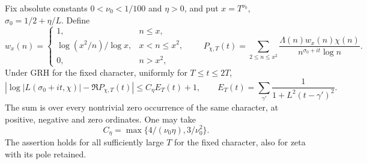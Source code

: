 \begin{lemma}
\label{lem:A049-smoothed-logarithm}
Fix absolute constants \(0<\nu_0<1/100\) and \(\eta>0\), and put
\(x=T^{\nu_0}\), \(\sigma_0=1/2+\eta/L\). Define
\[
 w_x(n)=
 \begin{cases}
 1,&n\le x,\\
 \log(x^2/n)/\log x,&x<n\le x^2,\\
 0,&n>x^2,
 \end{cases}
 \qquad
 P_{\chi,T}(t)=\sum_{2\le n\le x^2}
       \frac{\Lambda(n)w_x(n)\chi(n)}{n^{\sigma_0+it}\log n}.
\]
Under GRH for the fixed character, uniformly for \(T\le t\le2T\),
\begin{equation}\label{eq:A049-log-kernel}
 \left|\log|L(\sigma_0+it,\chi)|-\Re P_{\chi,T}(t)\right|
 \le C_\eta E_T(t)+1,\qquad
 E_T(t)=\sum_{\gamma'}\frac1{1+L^2(t-\gamma')^2}.
\end{equation}
The sum is over every nontrivial zero occurrence of the same
character, at positive, negative and zero ordinates.
One may take
\[
 C_\eta=\max\{4/(\nu_0\eta),3/\nu_0^2\}.
\]
The assertion holds for all sufficiently large \(T\) for the
fixed character, also for zeta with its pole retained.
\end{lemma}

